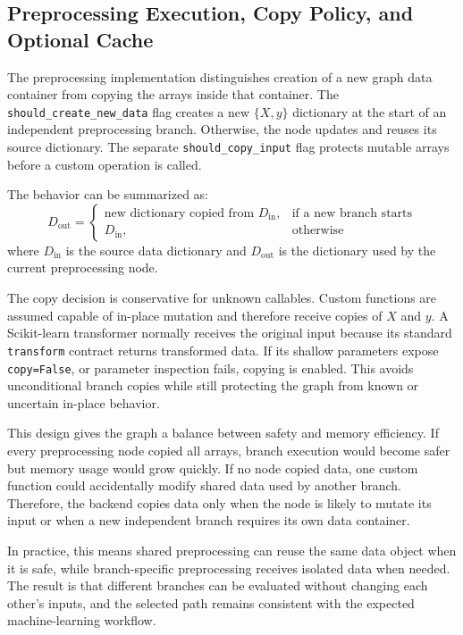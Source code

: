 \documentclass[12pt,a4paper,oneside]{report}
\begin{document}
\subsection{Preprocessing Execution, Copy Policy, and Optional Cache}

The preprocessing implementation distinguishes creation of a new graph data
container from copying the arrays inside that container. The
\texttt{should\_create\_new\_data} flag creates a new \(\{X,y\}\) dictionary at
the start of an independent preprocessing branch. Otherwise, the node updates
and reuses its source dictionary. The separate \texttt{should\_copy\_input} flag
protects mutable arrays before a custom operation is called.

The behavior can be summarized as:
\[
D_{\text{out}} =
\begin{cases}
\text{new dictionary copied from } D_{\text{in}}, & \text{if a new branch starts} \\
D_{\text{in}}, & \text{otherwise}
\end{cases}
\]
where \(D_{\text{in}}\) is the source data dictionary and \(D_{\text{out}}\) is
the dictionary used by the current preprocessing node.

The copy decision is conservative for unknown callables. Custom functions are
assumed capable of in-place mutation and therefore receive copies of \(X\) and
\(y\). A Scikit-learn transformer normally receives the original input because
its standard \texttt{transform} contract returns transformed data. If its shallow
parameters expose \texttt{copy=False}, or parameter inspection fails, copying is
enabled. This avoids unconditional branch copies while still protecting the
graph from known or uncertain in-place behavior.

This design gives the graph a balance between safety and memory efficiency. If
every preprocessing node copied all arrays, branch execution would become safer
but memory usage would grow quickly. If no node copied data, one custom function
could accidentally modify shared data used by another branch. Therefore, the
backend copies data only when the node is likely to mutate its input or when a
new independent branch requires its own data container.

In practice, this means shared preprocessing can reuse the same data object when
it is safe, while branch-specific preprocessing receives isolated data when
needed. The result is that different branches can be evaluated without changing
each other's inputs, and the selected path remains consistent with the expected
machine-learning workflow.
\end{document}
